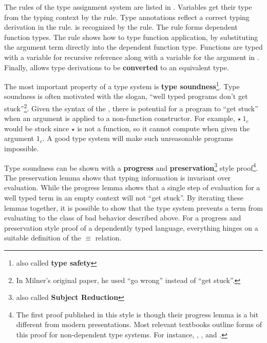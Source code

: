The rules of the type assignment system are listed in .
Variables get their type from the typing context by the  rule.
Type annotations reflect a correct typing derivation in the  rule.
\Tit{} is recognized by the  rule.
The  rule forms dependent function types.
The  rule shows how to type function application, by substituting the argument term directly into the dependent function type.
Functions are typed with a variable for recursive reference along with a variable for the argument in .
Finally,  allows type derivations to be \textbf{converted} to an equivalent type.
 
The most important property of a type system is \textbf{type soundness}\footnote{also called \textbf{type safety}}.
Type soundness is often motivated with the slogan, ``well typed programs don't get stuck''\cite{MILNER1978348}\footnote{
  In Milner's original paper, he used ``go wrong'' instead of ``get stuck''.
}.
Given the syntax of the \slang{}, there is potential for a program to ``get stuck'' when an argument is applied to a non-function constructor.
For example, $\star\ 1_{c}$ would be stuck since $\star$ is not a function, so it cannot compute when given the argument $1_{c}$.
A good type system will make such unreasonable programs impossible.
 
Type soundness can be shown with a \textbf{progress} and \textbf{preservation}\footnote{also called \textbf{Subject Reduction}} style proof\footnote{
 The first proof published in this style is \cite{WRIGHT199438} though their progress lemma is a bit different from modern presentations.
 Most relevant textbooks outline forms of this proof for non-dependent type systems.
 For instance, \cite[Part 2]{pierce2002types}, \cite{KOKKE2020102440}, and \cite[Chapter 11]{chlipala2017formal}.
 }.
The preservation lemma shows that typing information is invariant over evaluation.
While the progress lemma shows that a single step of evaluation for a well typed term in an empty context will not ``get stuck''.
By iterating these lemmas together, it is possible to show that the type system prevents a term from evaluating to the class of bad behavior described above.
For a progress and preservation style proof of a dependently typed language, everything hinges on a suitable definition of the $\equiv$ relation.
 

